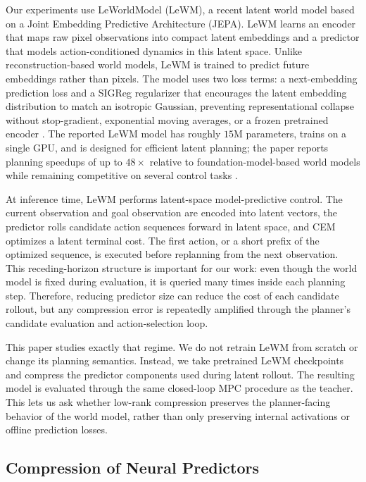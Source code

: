 \documentclass[11pt]{article}
\begin{document}
Our experiments use LeWorldModel (LeWM), a recent latent world model based on a Joint Embedding Predictive Architecture (JEPA). LeWM learns an encoder that maps raw pixel observations into compact latent embeddings and a predictor that models action-conditioned dynamics in this latent space. Unlike reconstruction-based world models, LeWM is trained to predict future embeddings rather than pixels. The model uses two loss terms: a next-embedding prediction loss and a SIGReg regularizer that encourages the latent embedding distribution to match an isotropic Gaussian, preventing representational collapse without stop-gradient, exponential moving averages, or a frozen pretrained encoder \citep{maes2026leworldmodel}. The reported LeWM model has roughly $15$M parameters, trains on a single GPU, and is designed for efficient latent planning; the paper reports planning speedups of up to $48\times$ relative to foundation-model-based world models while remaining competitive on several control tasks \citep{maes2026leworldmodel}.

At inference time, LeWM performs latent-space model-predictive control. The current observation and goal observation are encoded into latent vectors, the predictor rolls candidate action sequences forward in latent space, and CEM optimizes a latent terminal cost. The first action, or a short prefix of the optimized sequence, is executed before replanning from the next observation. This receding-horizon structure is important for our work: even though the world model is fixed during evaluation, it is queried many times inside each planning step. Therefore, reducing predictor size can reduce the cost of each candidate rollout, but any compression error is repeatedly amplified through the planner's candidate evaluation and action-selection loop.

This paper studies exactly that regime. We do not retrain LeWM from scratch or change its planning semantics. Instead, we take pretrained LeWM checkpoints and compress the predictor components used during latent rollout. The resulting model is evaluated through the same closed-loop MPC procedure as the teacher. This lets us ask whether low-rank compression preserves the planner-facing behavior of the world model, rather than only preserving internal activations or offline prediction losses.

\subsection{Compression of Neural Predictors}
\end{document}
